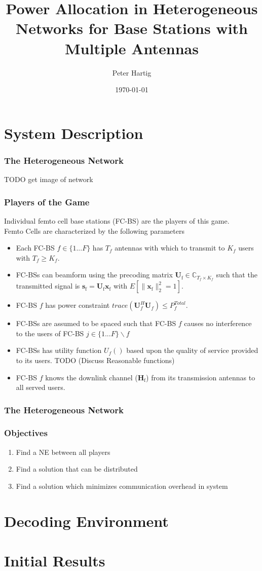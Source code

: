 \documentclass[10pt,tgadventor, onlymath]{beamer}
\title{\large \bfseries Power Allocation in Heterogeneous Networks for Base Stations with Multiple Antennas}
\author{Peter Hartig\\[3ex]
}
\date{\today}
\begin{document}
\frame{
\thispagestyle{empty}
\titlepage
}

\section{System Description}
\begin{frame}
\frametitle{The Heterogeneous Network}
TODO get image of network
\end{frame}

\begin{frame}
\frametitle{Players of the Game}


Individual femto cell base stations (FC-BS) are the players of this game.
\\
Femto Cells are characterized by the following parameters
\begin{itemize}
\item 
	Each FC-BS  $f \in \{1 ... F\}$ has $T_f$ antennas with which to transmit to $K_f$  users with  $T_f \geq K_f$.
\\
\item 
	FC-BSs  can beamform using the precoding 	
	matrix $\mathbf{U}_{\mathrm{f}} \in \mathbb{C}_{T_f \times K_f}$ such that the transmitted 		
	signal is $\mathbf{s}_{\mathrm{f}
	}= \mathbf{U_{\mathrm{f}}}\mathbf{x_{\mathrm{f}}}$ with $E[\|\mathbf{x}_{\mathrm{f}}\|_2^2 = 1]$.
\\
\item 
	FC-BS $f$ has power constraint $trace(\mathbf{U}_f^H\mathbf{U}_f) \leq P^{Total}_{f} $.
\\
\item
	 FC-BSs are assumed to be spaced such that FC-BS $f$ causes no interference to the users of FC-BS $j \in \{1 ... F\}\backslash f$
\item 
	FC-BSs has utility function $U_f()$ based upon the quality of service 		
	provided to its users. TODO (Discuss Reasonable functions)
\\
\item 
	FC-BS $f$ knows the downlink channel ($\mathbf{H_\mathrm{f}}$) from its transmission antennas to all served users.
\\
\end{itemize}

\end{frame}

\begin{frame}
\frametitle{The Heterogeneous Network}
\end{frame}

\begin{frame}
\frametitle{Objectives}
\begin{enumerate}
\item Find a NE between all players
\item Find a solution that can be distributed
\item Find a solution which minimizes communication overhead in system

\end{enumerate}
\end{frame}

\section{Decoding Environment}



\section{Initial Results}
\end{document}
